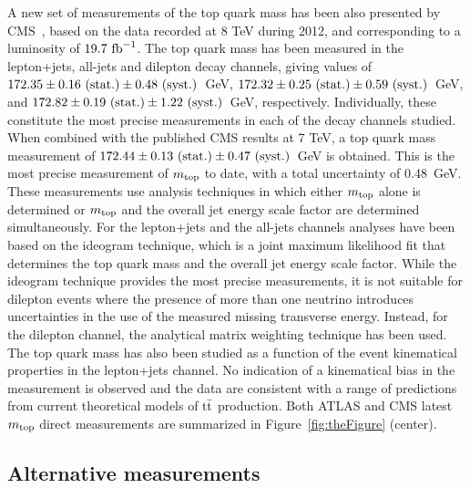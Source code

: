 \documentclass{blois}
\begin{document}
A new set of measurements of the top quark mass has been also presented by
CMS~\cite{bib:CMS-topMass8TeV}, based on the data recorded at 8 TeV during 2012,
and corresponding to a luminosity of
$19.7~{\rm fb}^{-1}$. The top quark mass has been measured in the lepton+jets,
all-jets and dilepton decay channels, giving values of
$172.35 \pm 0.16~({\rm stat.}) \pm 0.48~({\rm syst.})$~GeV,
$172.32 \pm 0.25~({\rm stat.}) \pm 0.59~({\rm syst.})$~GeV, and
$172.82 \pm 0.19~({\rm stat.}) \pm 1.22~({\rm syst.})$~GeV, respectively.
Individually, these constitute the most precise measurements in each of the
decay channels studied. When combined with the published CMS results at 7 TeV,
a top quark mass measurement of
$172.44 \pm 0.13~({\rm stat.}) \pm 0.47~({\rm syst.})$~GeV is obtained. This is
the most precise measurement of $m_{\rm top}$ to date, with a total uncertainty
of 0.48~GeV. These measurements use analysis techniques in which either
$m_{\rm top}$ alone is determined or $m_{\rm top}$ and the overall jet energy
scale factor are determined simultaneously. For the lepton+jets and the all-jets
channels analyses have been based on the ideogram technique, which is a joint
maximum likelihood fit that determines the top quark mass and the overall jet
energy scale factor.
While the ideogram technique provides the most precise measurements, it is not
suitable for dilepton events where the presence of more than one neutrino
introduces uncertainties in the use of the measured missing transverse energy.
Instead, for the dilepton channel, the analytical matrix weighting technique
has been used.
The top quark mass has also been studied as a function of the event
kinematical properties in the lepton+jets channel. No indication of a kinematical
bias in the measurement is observed and the data are consistent with a range of
predictions from current theoretical models of ${\rm t{\bar t}}$ production.
Both ATLAS and CMS latest $m_{\rm top}$ direct measurements are summarized
in Figure~\ref{fig:theFigure} (center).


\subsection{Alternative measurements}
\end{document}
